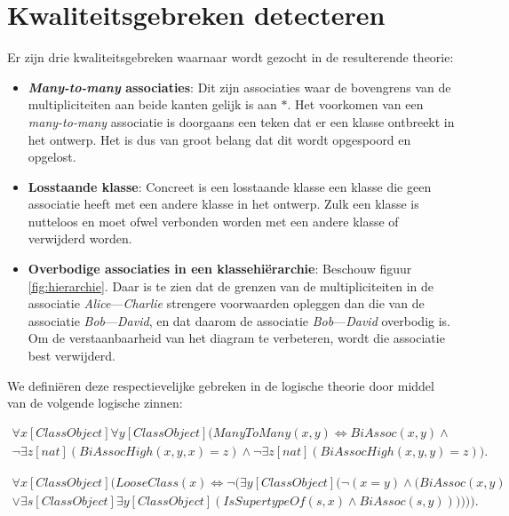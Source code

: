 \section{Kwaliteitsgebreken detecteren}
Er zijn drie kwaliteitsgebreken waarnaar wordt gezocht in de resulterende theorie:

\begin{itemize}
	\item \textbf{\textit{Many-to-many} associaties}: Dit zijn associaties waar de bovengrens van de multipliciteiten aan beide kanten gelijk is aan $*$. Het voorkomen van een \textit{many-to-many} associatie is doorgaans een teken dat er een klasse ontbreekt in het ontwerp. Het is dus van groot belang dat dit wordt opgespoord en opgelost.
	
	\item \textbf{Losstaande klasse}: Concreet is een losstaande klasse een klasse die geen associatie heeft met een andere klasse in het ontwerp. Zulk een klasse is nutteloos en moet ofwel verbonden worden met een andere klasse of verwijderd worden.
	
	\item \textbf{Overbodige associaties in een klassehi\"erarchie}\cite{Balaban2015}: Beschouw figuur \ref{fig:hierarchie}. Daar is te zien dat de grenzen van de multipliciteiten in de associatie \textit{Alice}---\textit{Charlie} strengere voorwaarden opleggen dan die van de associatie \textit{Bob}---\textit{David}, en dat daarom de associatie \textit{Bob}---\textit{David} overbodig is. Om de verstaanbaarheid van het diagram te verbeteren, wordt die associatie best verwijderd.
\end{itemize}

We defini\"eren deze respectievelijke gebreken in de logische theorie door middel van de volgende logische zinnen:

\begin{align}
	\nonumber \forall{x}[ClassObject]\forall{y}[ClassObject](ManyToMany(x,y) \Leftrightarrow BiAssoc(x,y) \land \\ \lnot\exists{z}[nat](BiAssocHigh(x,y,x) = z) \land \lnot\exists{z}[nat](BiAssocHigh(x,y,y) = z)).\label{form:manytomany}
\end{align}

\begin{align}
	\nonumber \forall{x}[ClassObject](LooseClass(x) \Leftrightarrow \lnot(\exists{y}[ClassObject](\lnot(x = y) \land (BiAssoc(x,y) \\ \lor \exists{s}[ClassObject]\exists{y}[ClassObject](\mathit{IsSupertypeOf}(s,x) \land BiAssoc(s,y)))))).\label{form:loose}
\end{align}

